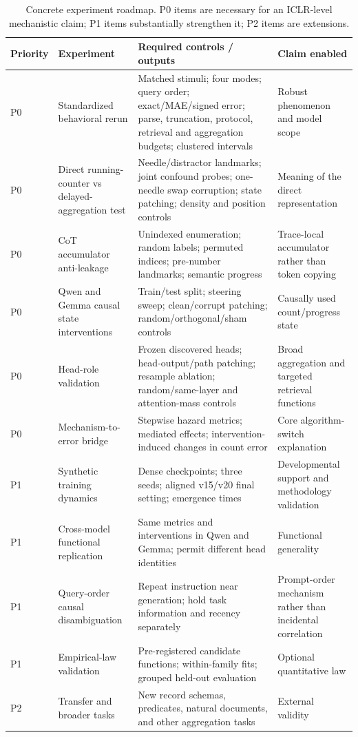 \documentclass[10pt,twocolumn]{article}
\begin{document}
\clearpage
\appendix
\begin{table}[t]
\centering
\small
\begin{tabularx}{\textwidth}{p{}p{}X p{}}
\toprule
Priority & Experiment & Required controls / outputs & Claim enabled \\
\midrule
P0 & Standardized behavioral rerun &
Matched stimuli; four modes; query order; exact/MAE/signed error; parse, truncation, protocol,
retrieval and aggregation budgets; clustered intervals &
Robust phenomenon and model scope \\
P0 & Direct running-counter vs delayed-aggregation test &
Needle/distractor landmarks; joint confound probes; one-needle swap corruption; state patching;
density and position controls &
Meaning of the direct representation \\
P0 & CoT accumulator anti-leakage &
Unindexed enumeration; random labels; permuted indices; pre-number landmarks; semantic progress &
Trace-local accumulator rather than token copying \\
P0 & Qwen and Gemma causal state interventions &
Train/test split; steering sweep; clean/corrupt patching; random/orthogonal/sham controls &
Causally used count/progress state \\
P0 & Head-role validation &
Frozen discovered heads; head-output/path patching; resample ablation; random/same-layer and
attention-mass controls &
Broad aggregation and targeted retrieval functions \\
P0 & Mechanism-to-error bridge &
Stepwise hazard metrics; mediated effects; intervention-induced changes in count error &
Core algorithm-switch explanation \\
P1 & Synthetic training dynamics &
Dense checkpoints; three seeds; aligned v15/v20 final setting; emergence times &
Developmental support and methodology validation \\
P1 & Cross-model functional replication &
Same metrics and interventions in Qwen and Gemma; permit different head identities &
Functional generality \\
P1 & Query-order causal disambiguation &
Repeat instruction near generation; hold task information and recency separately &
Prompt-order mechanism rather than incidental correlation \\
P1 & Empirical-law validation &
Pre-registered candidate functions; within-family fits; grouped held-out evaluation &
Optional quantitative law \\
P2 & Transfer and broader tasks &
New record schemas, predicates, natural documents, and other aggregation tasks &
External validity \\
\bottomrule
\end{tabularx}
\caption{Concrete experiment roadmap. P0 items are necessary for an ICLR-level mechanistic claim;
P1 items substantially strengthen it; P2 items are extensions.}
\end{table}
\end{document}
